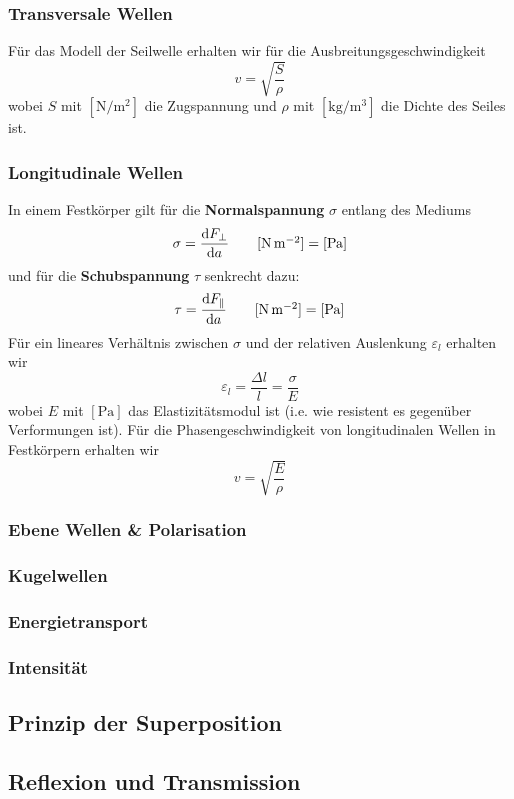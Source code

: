 \subsubsection{Transversale Wellen}
Für das Modell der Seilwelle erhalten wir für die Ausbreitungsgeschwindigkeit
$$v = \sqrt{\frac{S}{\rho}}$$
wobei $S$ mit $[\si{\newton\per\square\meter}]$ die Zugspannung und $\rho$ mit $[\si{\kilogram\per\meter\cubed}]$ die Dichte des Seiles ist.

\subsubsection{Longitudinale Wellen}
In einem Festkörper gilt für die \textbf{Normalspannung} $\sigma$ entlang des Mediums
\[\sigma = \diff {F_\perp} a \tag*{$[\si{\newton\per\meter\squared}] = [\si{\pascal}]$}\]
und für die \textbf{Schubspannung} $\tau$ senkrecht dazu:
\[\tau = \diff {F_\parallel} a \tag*{$[\si{\newton\per\meter\squared}] = [\si{\pascal}]$}\]
Für ein lineares Verhältnis zwischen $\sigma$ und der relativen Auslenkung $\varepsilon_l$ erhalten wir
$$\varepsilon_l = \frac{\Delta l}{l} = \frac{\sigma}{E}$$
wobei $E$ mit $[\si{\pascal}]$ das Elastizitätsmodul ist (i.e. wie resistent es gegenüber Verformungen ist). Für die Phasengeschwindigkeit von longitudinalen Wellen in Festkörpern erhalten wir
$$v = \sqrt{\frac{E}{\rho}}$$

\subsubsection{Ebene Wellen \& Polarisation}

\subsubsection{Kugelwellen}

\subsubsection{Energietransport}

\subsubsection{Intensität}

\subsection{Prinzip der Superposition}
\subsection{Reflexion und Transmission}
